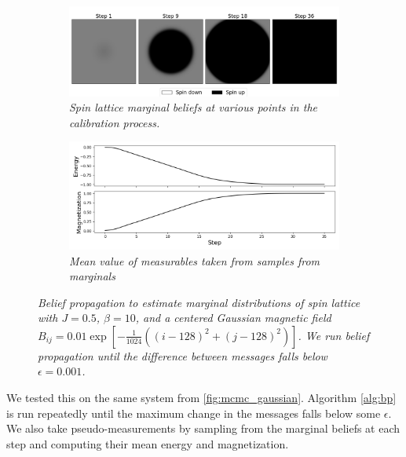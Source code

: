 \documentclass{article}
\begin{document}
\begin{figure}
    \begin{subfigure}{\textwidth}
        \includegraphics[width=\textwidth]{report_bp_gaussian}
        \centering
        \caption{\textit{
            Spin lattice marginal beliefs at various points in the calibration 
            process. 
        }}
        \label{fig:bp_gaussian_a}
    \end{subfigure}
    \begin{subfigure}{\textwidth}
        \includegraphics[width=\textwidth]{report_bp_gaussian_measurables}
        \centering
        \caption{\textit{Mean value of measurables taken from samples from marginals}}
        \label{fig:bp_gaussian_b}
    \end{subfigure}
    \centering
    \caption{\textit{
        Belief propagation to estimate marginal distributions of spin lattice 
        with $J = 0.5$, $\beta = 10$, and a centered Gaussian 
        magnetic field
        $B_{ij} = 0.01 \exp [-\frac{1}{1024}((i-128)^2 + (j-128)^2)]$. 
        We run belief propagation until the difference between messages falls 
        below $\epsilon = 0.001$. 
    }}
    \label{fig:bp_gaussian}
\end{figure}

We tested this on the same system from \ref{fig:mcmc_gaussian}. 
Algorithm \ref{alg:bp} is run repeatedly until the maximum change in the 
messages falls below some $\epsilon$. 
We also take pseudo-measurements by sampling from the marginal beliefs at 
each step and computing their mean energy and magnetization. 
\end{document}

